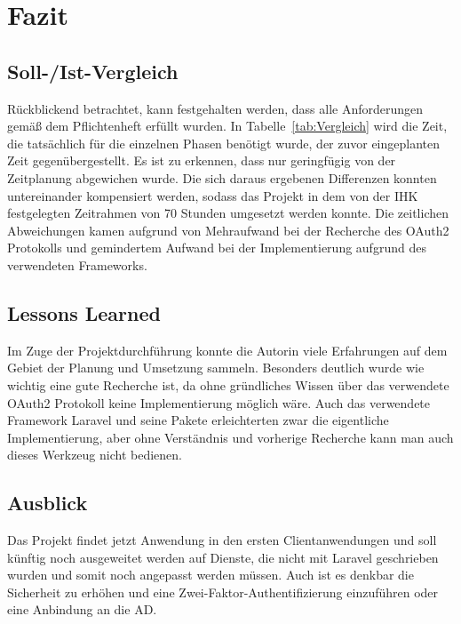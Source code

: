 \section{Fazit} 
\label{sec:Fazit}

\subsection{Soll-/Ist-Vergleich}
\label{sec:SollIstVergleich}
Rückblickend betrachtet, kann festgehalten werden, dass alle Anforderungen gemäß dem Pflichtenheft erfüllt wurden. 
In Tabelle~\ref{tab:Vergleich} wird die Zeit, die tatsächlich für die einzelnen Phasen benötigt wurde, der zuvor eingeplanten Zeit gegenübergestellt. 
Es ist zu erkennen, dass nur geringfügig von der Zeitplanung abgewichen wurde. Die sich daraus ergebenen Differenzen konnten untereinander kompensiert werden, sodass das Projekt in dem von der IHK festgelegten Zeitrahmen von 70 Stunden umgesetzt werden konnte.
Die zeitlichen Abweichungen kamen aufgrund von Mehraufwand bei der Recherche des OAuth2 Protokolls und gemindertem Aufwand bei der Implementierung aufgrund des verwendeten Frameworks.

\subsection{Lessons Learned}
\label{sec:LessonsLearned}
Im Zuge der Projektdurchführung konnte die Autorin viele Erfahrungen auf dem Gebiet der Planung und Umsetzung sammeln.
Besonders deutlich wurde wie wichtig eine gute Recherche ist, da ohne gründliches Wissen über das verwendete OAuth2 Protokoll keine Implementierung möglich wäre.
Auch das verwendete Framework Laravel und seine Pakete erleichterten zwar die eigentliche Implementierung, aber ohne Verständnis und vorherige Recherche kann man auch dieses Werkzeug nicht bedienen. 
\subsection{Ausblick}
\label{sec:Ausblick}
Das Projekt findet jetzt Anwendung in den ersten Clientanwendungen und soll künftig noch ausgeweitet werden auf Dienste, die nicht mit Laravel geschrieben wurden und somit noch angepasst werden müssen. Auch ist es denkbar die Sicherheit zu erhöhen und eine Zwei-Faktor-Authentifizierung einzuführen oder eine Anbindung an die AD.
